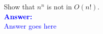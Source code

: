 \item{}
Show that $n^n$ is not in $O(n!)$.
\\[12pt]
\ifanswers
\textcolor{blue}{
\textbf{Answer:}\\[6pt]
Answer goes here
}
\newpage
\fi
